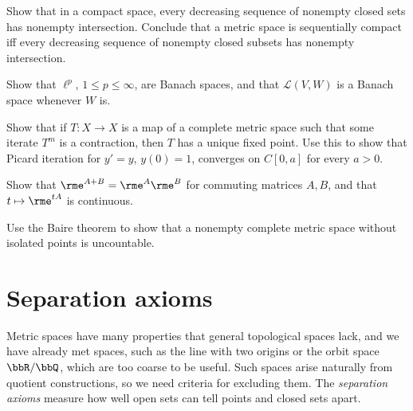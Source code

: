 \begin{xca}\label{xca nested compact}
    Show that in a compact space, every decreasing sequence of nonempty closed sets has nonempty intersection. Conclude that a metric space is sequentially compact iff every decreasing sequence of nonempty closed subsets has nonempty intersection.
\end{xca}
\begin{xca}\label{xca lp complete}
    Show that $\ell^p$, $1\leq p\leq\infty$, are Banach spaces, and that $\mathcal{L}(V,W)$ is a Banach space whenever $W$ is.
\end{xca}
\begin{xca}
    Show that if $T:X\to X$ is a map of a complete metric space such that some iterate $T^m$ is a contraction, then $T$ has a unique fixed point. Use this to show that Picard iteration for $y'=y$, $y(0)=1$, converges on $C[0,a]$ for every $a>0$.
\end{xca}
\begin{xca}
    Show that $\rme^{A+B}=\rme^A\rme^B$ for commuting matrices $A,B$, and that $t\mapsto\rme^{tA}$ is continuous.
\end{xca}
\begin{xca}
    Use the Baire theorem to show that a nonempty complete metric space without isolated points is uncountable.
\end{xca}


\section{Separation axioms} \label{Separation Axioms}

Metric spaces have many properties that general topological spaces lack, and we have already met spaces, such as the line with two origins or the orbit space $\bbR/\bbQ$, which are too coarse to be useful. Such spaces arise naturally from quotient constructions, so we need criteria for excluding them. The \emph{separation axioms} measure how well open sets can tell points and closed sets apart.

